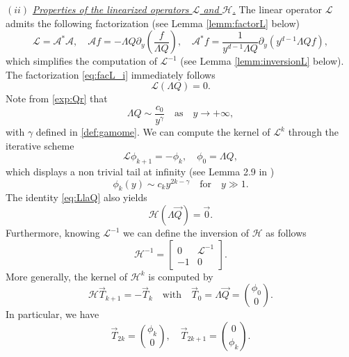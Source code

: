 \documentclass[11pt]{aims}
\theoremstyle{definition}
\numberwithin{equation}{section}
\begin{document}
\noindent $(ii)$ \underline{\textit{Properties of the linearized operators ${\mathscr{L}}$ and ${\mathscr{H}}$.}} The linear operator ${\mathscr{L}}$ admits the following factorization (see Lemma \ref{lemm:factorL} below)
\begin{equation}\label{eq:facL_i}
{\mathscr{L}} = {\mathscr{A}}^*{\mathscr{A}}, \quad {\mathscr{A}} f = -\Lambda Q {\partial_y} \left(\frac{f}{\Lambda Q} \right), \quad {\mathscr{A}}^*f = \frac{1}{y^{d-1}\Lambda Q}{\partial_y}\left(y^{d-1}\Lambda Q f\right), 
\end{equation}
which simplifies the computation of ${\mathscr{L}}^{-1}$ (see Lemma \ref{lemm:inversionL} below). The factorization  \eqref{eq:facL_i} immediately follows
\begin{equation}\label{eq:LlaQ}
{\mathscr{L}}(\Lambda Q) = 0.
\end{equation}
Note from \eqref{exp:Qr} that
$$\Lambda Q \sim \frac{c_0}{y^\gamma} \quad \text{as} \quad y \to +\infty,$$
with $\gamma$ defined in \eqref{def:gamome}. We can compute the kernel of ${\mathscr{L}}^k$ through the iterative scheme
\begin{equation}\label{def:phik}
{\mathscr{L}} \phi_{k+1} = -\phi_k, \quad \phi_0 = \Lambda Q,
\end{equation}
which displays a non trivial tail at infinity (see Lemma 2.9 in \cite{IGN16})
\begin{equation}\label{asy:phik}
\phi_k(y) \sim c_k y^{2k - \gamma} \quad \text{for} \quad y \gg 1.
\end{equation}
The identity \eqref{eq:LlaQ} also yields
$${\mathscr{H}} (\Lambda \vec Q) = \vec 0.$$
Furthermore, knowing ${\mathscr{L}}^{-1}$ we can define the inversion of ${\mathscr{H}}$ as follows
\begin{equation}
{\mathscr{H}}^{-1} = \begin{bmatrix}
0 & {\mathscr{L}}^{-1}\\ -1 &0
\end{bmatrix}.
\end{equation}
More generally, the kernel of ${\mathscr{H}}^k$ is computed  by
\begin{equation}\label{def:Tk_i}
{\mathscr{H}} \vec T_{k + 1} = - \vec T_k \quad \text{with} \quad \vec T_0 = \Lambda \vec Q = \binom{\phi_0}{0}.
\end{equation}
In particular, we have
\begin{equation}\label{eq:formTk_i}
\vec T_{2k} = \binom{\phi_k}{0}, \quad \vec T_{2k + 1} = \binom{0}{\phi_k}.
\end{equation}
\end{document}
